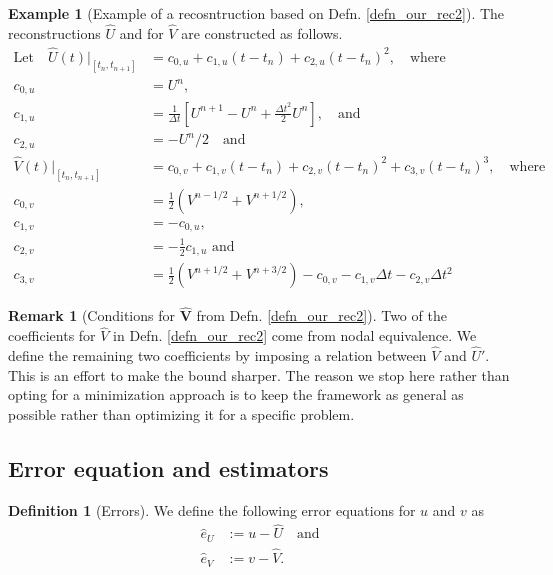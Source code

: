 \documentclass[12pt,a4paper]{article}
\numberwithin{equation}{section}
\theoremstyle{definition}
\newcommand{\qp}[1]{\left(#1\right)}
\newcommand{\qb}[1]{\left[#1\right]}
\newcommand{\rec}[1]{\widehat{{#1}}}
\newtheorem{Defn}[subsection]{Definition}
\newtheorem{Rem}[subsection]{Remark}
\newtheorem{Example}[subsection]{Example}
\begin{document}
\begin{Example}[Example of a recosntruction based on Defn. \ref{defn_our_rec2}]\label{example:sample_rec}
The reconstructions $\rec{U}$  and for $\rec{V}$ are constructed as follows.
\begin{equation}
\begin{aligned}
\text{Let}\quad\hat{U}\qp{t}|_{\qb{{t_n, t_{n+1}}}}&= c_{0,u} +c_{1,u}\qp{t-t_n} +c_{2,u}\qp{t-t_n}^2,\quad\text{where}\\
c_{0,u} &= U^n,\\
c_{1,u} &= \frac{1}{\Delta t}\qb{U^{n+1}-U^n + \frac{\Delta t^2}{2}U^n},\quad\text{and}\\
c_{2,u} &= -U^n/2\quad \text{and}\\
\hat{V}\qp{t}|_{\qb{{t_n, t_{n+1}}}}&= c_{0,v} +c_{1,v}\qp{t-t_n} +c_{2,v}\qp{t-t_n}^2+c_{3,v}\qp{t-t_n}^3,\quad\text{where}\\
c_{0,v} &=\frac{1}{2}\qp{V^{n-1/2}+V^{n+1/2} },\\
c_{1,v} &= -c_{0,u},\\
c_{2,v} &= -\frac{1}{2}c_{1,u}\text{  and}\\
c_{3,v} &= \frac{1}{2}\qp{V^{n+1/2}+V^{n+3/2} }-c_{0,v}- c_{1,v}\Delta t- c_{2,v}\Delta t^2
\end{aligned}
\end{equation}
\end{Example}



\begin{Rem}[Conditions for $\hat{\textbf{V}}$ from Defn. \ref{defn_our_rec2}]
Two of the coefficients for $\rec{V}$ in Defn. \ref{defn_our_rec2} come from nodal equivalence.  We define the remaining two coefficients  by imposing a relation between $\rec{V}$ and $\rec{U}'$.  This is an effort to make the bound sharper. The reason we stop here rather than opting for a minimization approach is to keep the framework as general as possible rather than optimizing it for a specific problem.
\end{Rem}
\subsection{Error equation and estimators}\label{subsec_error_estimators}
\begin{Defn}[Errors]\label{defn:errors}
We define the following error equations for $u$ and $v$ as
\begin{equation}\label{eq_err_rec_uv}
\begin{aligned}
\hat{e}_U&:=u-\hat{U} \quad \text{and}\\
\hat{e}_V&:=v-\hat{V}.
\end{aligned}
\end{equation}
\end{Defn}
\end{document}

